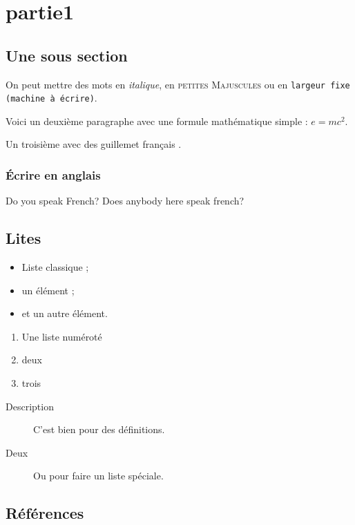 \section{partie1}
\subsection{Une sous section}

On peut mettre des mots en \emph{italique}, 
en \textsc{petites Majuscules} ou 
en \texttt{largeur fixe (machine à écrire)}.

Voici un deuxième paragraphe avec une formule mathématique simple : $e = mc^2$.

Un troisième avec des \og guillemet français \fg{}.

\subsubsection{Écrire en anglais}

\foreignlanguage{english}{Do you speak French? Does anybody here speak french?}


\subsection{Lites}

\begin{itemize}
\item Liste classique ;
\item un élément ;
\item et un autre élément.
\end{itemize}
\vspace{\parskip} %

\begin{enumerate}
\item Une liste numéroté
\item deux
\item trois
\end{enumerate}
\vspace{\parskip}

\begin{description}
\item[Description] C'est bien pour des définitions.
\item[Deux] Ou pour faire un liste spéciale.
\end{description}
\vspace{\parskip}


\subsection{Références}

